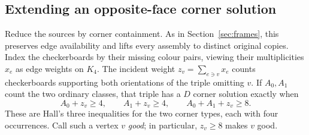 \subsection{Extending an opposite-face corner solution}
Reduce the sources by corner containment. As in Section~\ref{sec:frames},
this preserves edge availability and lifts every assembly to distinct
original copies. Index the checkerboards by their missing colour pairs,
viewing their multiplicities $x_e$ as edge weights on $K_4$.
The incident weight $z_v=\sum_{e\ni v}x_e$ counts checkerboards supporting
both orientations of the triple omitting $v$.
If $A_0,A_1$ count the two ordinary classes, that triple has a $D$ corner
solution exactly when
\begin{equation}\label{eq:cuboid-good}
 A_0+z_v\ge4,\qquad A_1+z_v\ge4,\qquad A_0+A_1+z_v\ge8.
\end{equation}
These are Hall's three inequalities for the two corner types, each with
four occurrences. Call such a vertex $v$ \emph{good}; in particular,
$z_v\ge8$ makes $v$ good.


